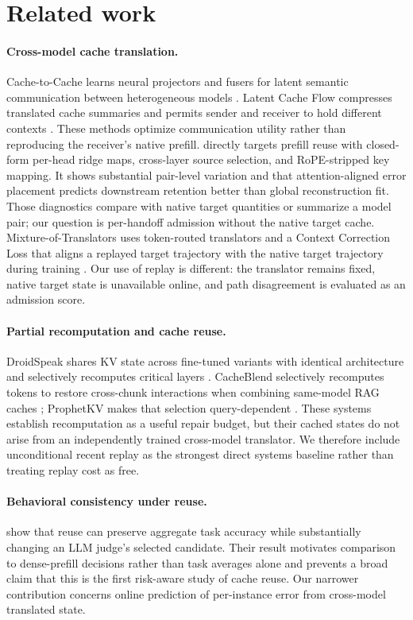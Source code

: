 \documentclass[10pt,twocolumn]{article}
\begin{document}
\section{Related work}

\paragraph{Cross-model cache translation.}
Cache-to-Cache learns neural projectors and fusers for latent semantic
communication between heterogeneous models \citep{fu2026c2c}.  Latent Cache
Flow compresses translated cache summaries and permits sender and receiver to
hold different contexts \citep{rossi2026lcf}.  These methods optimize
communication utility rather than reproducing the receiver's native prefill.
\citet{heo2026crossmodel} directly targets prefill reuse with closed-form
per-head ridge maps, cross-layer source selection, and RoPE-stripped key
mapping.  It shows substantial pair-level variation and that attention-aligned
error placement predicts downstream retention better than global
reconstruction fit.  Those diagnostics compare with native target quantities
or summarize a model pair; our question is per-handoff admission without the
native target cache.  Mixture-of-Translators uses token-routed translators and
a Context Correction Loss that aligns a replayed target trajectory with the
native target trajectory during training \citep{lee2026mot}.  Our use of
replay is different: the translator remains fixed, native target state is
unavailable online, and path disagreement is evaluated as an admission score.

\paragraph{Partial recomputation and cache reuse.}
DroidSpeak shares KV state across fine-tuned variants with identical
architecture and selectively recomputes critical layers
\citep{liu2024droidspeak}.  CacheBlend selectively recomputes tokens to restore
cross-chunk interactions when combining same-model RAG caches
\citep{yao2024cacheblend}; ProphetKV makes that selection query-dependent
\citep{wang2026prophetkv}.  These systems establish recomputation as a useful
repair budget, but their cached states do not arise from an independently
trained cross-model translator.  We therefore include unconditional recent
replay as the strongest direct systems baseline rather than treating replay
cost as free.

\paragraph{Behavioral consistency under reuse.}
\citet{liang2026reusefails} show that reuse can preserve aggregate task
accuracy while substantially changing an LLM judge's selected candidate.
Their result motivates comparison to dense-prefill decisions rather than task
averages alone and prevents a broad claim that this is the first risk-aware
study of cache reuse.  Our narrower contribution concerns online prediction
of per-instance error from cross-model translated state.
\end{document}
